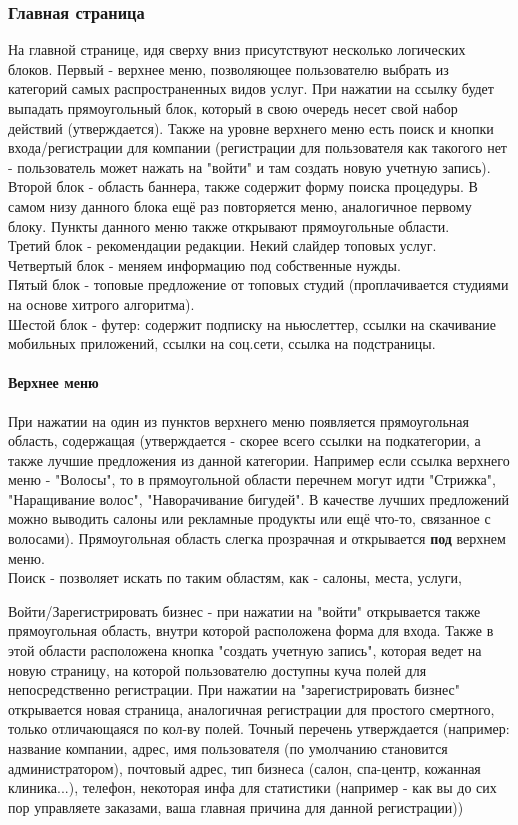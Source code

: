\documentclass[DIV=calc, paper=a4, fontsize=11pt]{scrartcl} %
\begin{document}
\subsubsection{Главная страница}

На главной странице, идя сверху вниз присутствуют несколько логических блоков. Первый - верхнее меню, позволяющее пользователю выбрать из категорий самых распространенных видов услуг. При нажатии на ссылку будет выпадать прямоугольный блок, который в свою очередь несет свой набор действий (утверждается). Также на уровне верхнего меню есть поиск и кнопки входа/регистрации для компании (регистрации для пользователя как такогого нет - пользователь может нажать на "войти" и там создать новую учетную запись).
\\Второй блок - область баннера, также содержит форму поиска процедуры. В самом низу данного блока ещё раз повторяется меню, аналогичное первому блоку. Пункты данного меню также открывают прямоугольные области.
\\Третий блок - рекомендации редакции. Некий слайдер топовых услуг.
\\Четвертый блок - меняем информацию под собственные нужды.
\\Пятый блок - топовые предложение от топовых студий (проплачивается студиями на основе хитрого алгоритма).
\\Шестой блок - футер: содержит подписку на ньюслеттер, ссылки на скачивание мобильных приложений, ссылки на соц.сети, ссылка на подстраницы.

\paragraph{Верхнее меню}
При нажатии на один из пунктов верхнего меню появляется прямоугольная область, содержащая (утверждается - скорее всего ссылки на подкатегории, а также лучшие предложения из данной категории. Например если ссылка верхнего меню - "Волосы", то в прямоугольной области перечнем могут идти "Стрижка", "Наращивание волос", "Наворачивание бигудей". В качестве лучших предложений можно выводить салоны или рекламные продукты или ещё что-то, связанное с волосами). Прямоугольная область слегка прозрачная и открывается \textbf{под} верхнем меню. 
\\[0.5cm]
Поиск - позволяет искать по таким областям, как - салоны, места, услуги, 

Войти/Зарегистрировать бизнес - при нажатии на "войти" открывается также прямоугольная область, внутри которой расположена форма для входа. Также в этой области расположена кнопка "создать учетную запись", которая ведет на новую страницу, на которой пользователю доступны куча полей для непосредственно регистрации.
При нажатии на "зарегистрировать бизнес" открывается новая страница, аналогичная регистрации для простого смертного, только отличающаяся по кол-ву полей. Точный перечень утверждается (например: название компании, адрес, имя пользователя (по умолчанию становится администратором), почтовый адрес, тип бизнеса (салон, спа-центр, кожанная клиника...), телефон, некоторая инфа для статистики (например - как вы до сих пор управляете заказами, ваша главная причина для данной регистрации))
\end{document}
